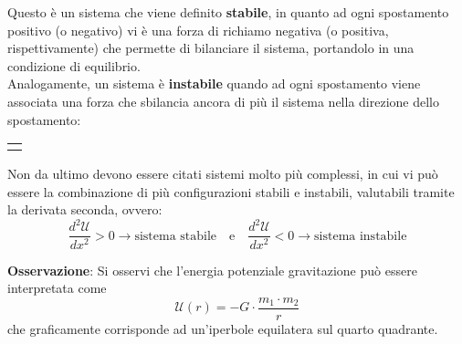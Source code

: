 \documentclass[a4paper]{extarticle}
\begin{document}
\noindent
Questo è un sistema che viene definito \textbf{stabile}, in quanto ad ogni spostamento positivo (o negativo) vi è una forza di richiamo negativa (o positiva, rispettivamente) che permette di bilanciare il sistema, portandolo in una condizione di equilibrio.\\
Analogamente, un sistema è \textbf{instabile} quando ad ogni spostamento viene associata una forza che sbilancia ancora di più il sistema nella direzione dello spostamento:

\vspace{2em}
\noindent
{}
\begin{tabularx}{\textwidth}{P}
  {
      \centering
  }
\end{tabularx}

\noindent
Non da ultimo devono essere citati sistemi molto più complessi, in cui vi può essere la combinazione di più configurazioni stabili e instabili, valutabili tramite la derivata seconda, ovvero:
\[\frac{d^2 \mathcal{U}}{dx^2} > 0 \longrightarrow \text{sistema stabile} \hspace{1em} \text{e} \hspace{1em} \frac{d^2 \mathcal{U}}{dx^2} < 0 \longrightarrow \text{sistema instabile}\]

\vspace{1em}
\noindent
\textbf{Osservazione}: Si osservi che l'energia potenziale gravitazione può essere interpretata come
\[\boxed{\mathcal{U}(r) = - G \cdot \frac{m_1 \cdot m_2}{r}}\]
che graficamente corrisponde ad un'iperbole equilatera sul quarto quadrante.
\end{document}
